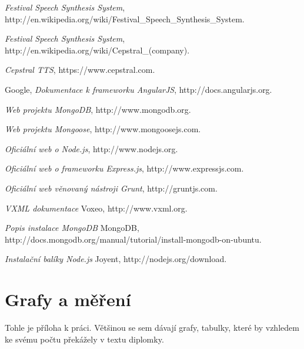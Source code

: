 \documentclass[ing,male,java,dept460]{diploma}						%
\begin{document}
\begin{thebibliography}{99}
\textit{Festival Speech Synthesis System}, http://en.wikipedia.org/wiki/Festival\_Speech_Synthesis_System.

\textit{Festival Speech Synthesis System}, http://en.wikipedia.org/wiki/Cepstral\_(company).

\textit{Cepstral TTS}, https://www.cepstral.com.

 Google,
\textit{Dokumentace k frameworku AngularJS}, http://docs.angularjs.org.

\textit{Web projektu MongoDB}, http://www.mongodb.org.

\textit{Web projektu Mongoose}, http://www.mongoosejs.com.

\textit{Oficiální web o Node.js}, http://www.nodejs.org.

\textit{Oficiální web o frameworku Express.js}, http://www.expressjs.com.

\textit{Oficiální web věnovaný nástroji Grunt}, http://gruntjs.com.

\textit{VXML dokumentace} Voxeo, http://www.vxml.org.

\textit{Popis instalace MongoDB} MongoDB, http://docs.mongodb.org/manual/tutorial/install-mongodb-on-ubuntu.

\textit{Instalační balíky Node.js} Joyent, http://nodejs.org/download.

\end{thebibliography}

\appendix
\section{Grafy a měření}
Tohle je příloha k práci. Většinou se sem dávají grafy, tabulky, které by vzhledem
ke svému počtu překážely v textu diplomky.
\clearpage
\end{document}
